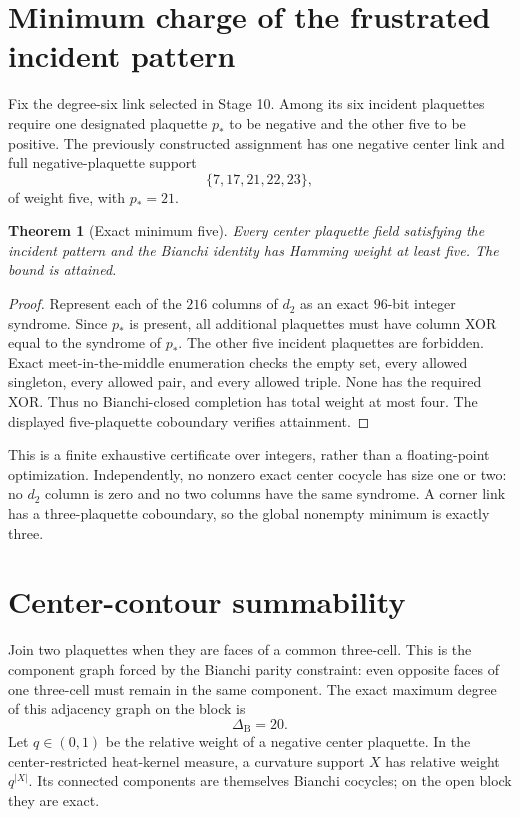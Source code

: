 \documentclass[11pt]{article}
\newtheorem{theorem}{Theorem}[section]
\begin{document}
\section{Minimum charge of the frustrated incident pattern}

Fix the degree-six link selected in Stage 10.  Among its six incident
plaquettes require one designated plaquette $p_*$ to be negative and the other
five to be positive.  The previously constructed assignment has one negative
center link and full negative-plaquette support
\[
 \{7,17,21,22,23\},
\]
of weight five, with $p_*=21$.

\begin{theorem}[Exact minimum five]
Every center plaquette field satisfying the incident pattern and the Bianchi
identity has Hamming weight at least five.  The bound is attained.
\end{theorem}
\begin{proof}
Represent each of the $216$ columns of $d_2$ as an exact $96$-bit integer
syndrome.  Since $p_*$ is present, all additional plaquettes must have column
XOR equal to the syndrome of $p_*$.  The other five incident plaquettes are
forbidden.  Exact meet-in-the-middle enumeration checks the empty set, every
allowed singleton, every allowed pair, and every allowed triple.  None has the
required XOR.  Thus no Bianchi-closed completion has total weight at most
four.  The displayed five-plaquette coboundary verifies attainment.
\end{proof}

This is a finite exhaustive certificate over integers, rather than a
floating-point optimization.  Independently, no nonzero exact center cocycle
has size one or two: no $d_2$ column is zero and no two columns have the same
syndrome.  A corner link has a three-plaquette coboundary, so the global
nonempty minimum is exactly three.

\section{Center-contour summability}

Join two plaquettes when they are faces of a common three-cell.  This is the
component graph forced by the Bianchi parity constraint: even opposite faces
of one three-cell must remain in the same component.  The exact maximum degree
of this adjacency graph on the block is
\[
 \Delta_{\mathrm B}=20.
\]
Let $q\in(0,1)$ be the relative weight of a negative center plaquette.  In the
center-restricted heat-kernel measure, a curvature support $X$ has relative
weight $q^{|X|}$.  Its connected components are themselves Bianchi cocycles;
on the open block they are exact.
\end{document}
